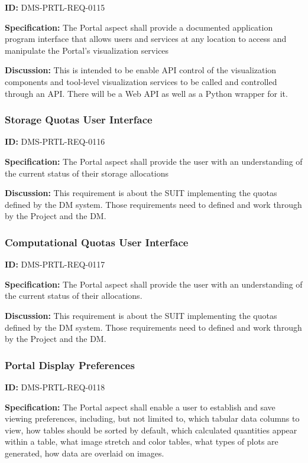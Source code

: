 \documentclass[SE,toc]{lsstdoc}
\begin{document}
\label{DMS-PRTL-REQ-0115}
\textbf{ID:} DMS-PRTL-REQ-0115

\textbf{Specification:}
The Portal aspect shall provide a documented application program interface that allows users and services at any location to access and manipulate the Portal's visualization services

\textbf{Discussion:}
This is intended to be enable API control of the visualization components and tool-level visualization services to be called and controlled through an API.
There will be a Web API as well as a Python wrapper for it.

\subsubsection{Storage Quotas User Interface}

\label{DMS-PRTL-REQ-0116}
\textbf{ID:} DMS-PRTL-REQ-0116

\textbf{Specification:}
The Portal aspect shall provide the user with an understanding of the current status of their storage allocations

\textbf{Discussion:}
This requirement is about the SUIT implementing the quotas defined by the DM system.  Those requirements need to defined and work through by the Project and the DM.

\subsubsection{Computational Quotas User Interface}

\label{DMS-PRTL-REQ-0117}
\textbf{ID:} DMS-PRTL-REQ-0117

\textbf{Specification:}
The Portal aspect shall provide the user with an understanding of the current status of their allocations.

\textbf{Discussion:}
This requirement is about the SUIT implementing the quotas defined by the DM system.  Those requirements need to defined and work through by the Project and the DM.

\subsubsection{Portal Display Preferences}

\label{DMS-PRTL-REQ-0118}
\textbf{ID:} DMS-PRTL-REQ-0118

\textbf{Specification:}
The Portal aspect shall enable a user to establish and save viewing preferences, including, but not limited to, which tabular data columns to view, how tables should be sorted by default, which calculated quantities appear within a table, what image stretch and color tables, what types of plots are generated, how data are overlaid on images.
\end{document}
